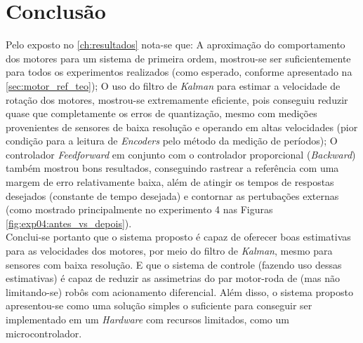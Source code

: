 \chapter[Conclusão]{Conclusão}
\label{ch:conclusao}


Pelo exposto no \autoref{ch:resultados} nota-se que: A aproximação do comportamento dos motores para um sistema de primeira ordem, mostrou-se ser suficientemente para todos os experimentos realizados (como esperado, conforme apresentado na \autoref{sec:motor_ref_teo}); O uso do filtro de \emph{Kalman} para estimar a velocidade de rotação dos motores, mostrou-se extremamente eficiente, pois conseguiu reduzir quase que completamente os erros de quantização, mesmo com medições provenientes de sensores de baixa resolução e operando em altas velocidades (pior condição para a leitura de \emph{Encoders} pelo método da medição de períodos); O controlador \emph{Feedforward} em conjunto com o controlador proporcional (\emph{Backward}) também mostrou bons resultados, conseguindo rastrear a referência com uma margem de erro relativamente baixa, além de atingir os tempos de respostas desejados (constante de tempo desejada) e contornar as pertubações externas (como mostrado principalmente no experimento 4 nas Figuras \ref{fig:exp04:antes_vs_depois}).\\

Conclui-se portanto que o sistema proposto é capaz de oferecer boas estimativas para as velocidades dos motores, por meio do filtro de \emph{Kalman}, mesmo para sensores com baixa resolução. E que o sistema de controle (fazendo uso dessas estimativas) é capaz de reduzir as assimetrias do par motor-roda de (mas não limitando-se) robôs com acionamento diferencial. Além disso, o sistema proposto apresentou-se como uma solução simples o suficiente para conseguir ser implementado em um \emph{Hardware} com recursos limitados, como um  microcontrolador.\\


